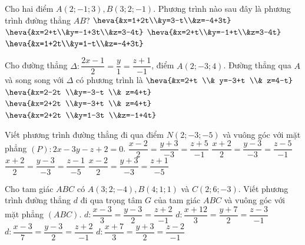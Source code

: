 \begin{ex}
	Cho hai điểm $A(2;-1;3), B(3;2;-1)$. Phương trình nào sau đây là phương trình đường thẳng $AB$?
	\choice
	{$\heva{&x=1+2t\\&y=3-t\\&z=-4+3t}$}
	{\True $\heva{&x=2+t\\&y=-1+3t\\&z=3-4t}$}
	{$\heva{&x=2+t\\&y=-1+t\\&z=3-4t}$}
	{$\heva{&x=1+2t\\&y=1-t\\&z=-4+3t}$}
	\loigiai{
	}
\end{ex}

\begin{ex}
	Cho đường thẳng $\Delta: \dfrac{2x-1}{2}=\dfrac{y}{1}=\dfrac{z+1}{-1}$, điểm $A(2;-3;4)$. Đường thẳng qua $A$ và song song với $\Delta$ có phương trình là
	\choice
	{ $\heva{&x=2+t  \\&	y=-3+t  \\&	z=4-t}$}
	{\True $\heva{&x=2-2t  \\&y=-3-t  \\&	z=4+t}$}
	{$\heva{&x=2+2t  \\&y=-3+t  \\&	z=4+t}$}
	{ $\heva{&x=2+2t  \\&y=1-3t  \\&z=-1+4t}$}
	\loigiai{
	}
\end{ex}

\begin{ex}
	Viết phương trình đường thẳng đi qua điểm $N(2;-3;-5)$ và vuông góc với mặt phẳng $(P): 2x-3y-z+2=0$.
	\choice
	{\True $\dfrac{x-2}{2}=\dfrac{y+3}{-3}=\dfrac{z+5}{-1}$}
	{$\dfrac{x+2}{2}=\dfrac{y-3}{-3}=\dfrac{z-5}{-1}$}
	{$\dfrac{x+2}{2}=\dfrac{y-3}{-3}=\dfrac{z-1}{-5}$}
	{$\dfrac{x-2}{2}=\dfrac{y+3}{-3}=\dfrac{z+1}{-5}$}
	\loigiai{
	}
\end{ex}

\begin{ex}
	Cho tam giác $ABC$ có $A(3;2;-4), B(4;1;1)$ và $C(2;6;-3).$ Viết phương trình đường thẳng $d$ đi qua trọng tâm $G$ của tam giác $ABC$ và vuông góc với mặt phẳng $(ABC)$.
	\choice
	{$d:\dfrac{x-3}{3}=\dfrac{y-3}{2}=\dfrac{z+2}{-1}$}
	{$d:\dfrac{x+12}{3}=\dfrac{y+7}{2}=\dfrac{z-3}{-1}$}
	{\True $d:\dfrac{x-3}{7}=\dfrac{y-3}{2}=\dfrac{z+2}{-1}$}
	{$d:\dfrac{x+7}{3}=\dfrac{y+3}{2}=\dfrac{z-2}{-1}$}
	\loigiai{
	}
\end{ex}

